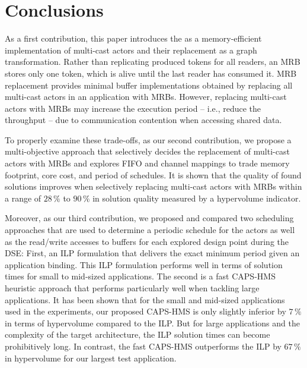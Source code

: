 \section{Conclusions}\label{sec:conclusions}
As a first contribution, this paper introduces the  as a memory-efficient implementation of multi-cast actors and their replacement as a graph transformation.
Rather than replicating produced tokens for all readers, an \ac{MRB} stores only one token, which is alive until the last reader has consumed it.
\ac{MRB} replacement provides minimal buffer implementations obtained by replacing all multi-cast actors in an application with \acp{MRB}.
However, replacing multi-cast actors with \acp{MRB} may increase the execution period -- i.e., reduce the throughput -- due to communication contention when accessing shared data.
\par
To properly examine these trade-offs, as our second contribution, we propose a multi-objective  approach that selectively decides the replacement of multi-cast actors with \acp{MRB} and explores FIFO and channel mappings to trade memory footprint, core cost, and period of schedules.
It is shown that the quality of found solutions improves when selectively replacing multi-cast actors with \acp{MRB} within a range of $28\,\%$ to $90\,\%$ in solution quality measured by a hypervolume indicator.
\par
Moreover, as our third contribution, we proposed and compared two scheduling approaches that are used to determine a periodic schedule for the actors as well as the read/write accesses to buffers for each explored design point during the DSE:
First, an \ac{ILP} formulation that delivers the exact minimum period given an application binding.
This \ac{ILP} formulation performs well in terms of solution times for small to mid-sized applications.
The second is a fast \ac{CAPS-HMS} heuristic approach that performs particularly well when tackling large applications.
It has been shown that for the small and mid-sized applications used in the experiments, our proposed \ac{CAPS-HMS} is only slightly inferior by $7\,\%$ in terms of hypervolume compared to the \ac{ILP}.
But for large applications and the complexity of the target architecture, the \ac{ILP} solution times can become prohibitively long.
In contrast, the fast \ac{CAPS-HMS} outperforms the \ac{ILP} by $67\,\%$ in hypervolume for our largest test application.
